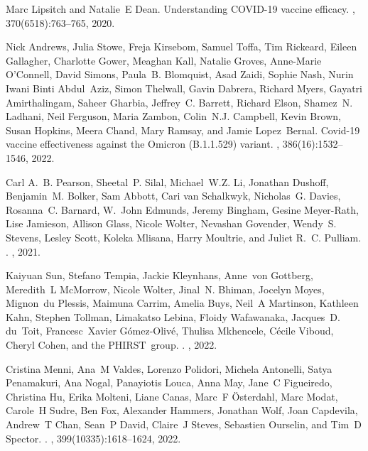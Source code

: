 \documentclass[12pt]{article}
\begin{document}
\begin{thebibliography}{10}
Marc Lipsitch and Natalie~E Dean.
\newblock Understanding {COVID-19} vaccine efficacy.
, 370(6518):763--765, 2020.

Nick Andrews, Julia Stowe, Freja Kirsebom, Samuel Toffa, Tim Rickeard, Eileen
  Gallagher, Charlotte Gower, Meaghan Kall, Natalie Groves, Anne-Marie
  O’Connell, David Simons, Paula~B. Blomquist, Asad Zaidi, Sophie Nash, Nurin
  Iwani Binti Abdul~Aziz, Simon Thelwall, Gavin Dabrera, Richard Myers, Gayatri
  Amirthalingam, Saheer Gharbia, Jeffrey~C. Barrett, Richard Elson, Shamez~N.
  Ladhani, Neil Ferguson, Maria Zambon, Colin~N.J. Campbell, Kevin Brown, Susan
  Hopkins, Meera Chand, Mary Ramsay, and Jamie Lopez~Bernal.
\newblock Covid-19 vaccine effectiveness against the {Omicron (B.1.1.529)}
  variant.
, 386(16):1532--1546, 2022.

Carl A.~B. Pearson, Sheetal~P. Silal, Michael~W.Z. Li, Jonathan Dushoff,
  Benjamin~M. Bolker, Sam Abbott, Cari van Schalkwyk, Nicholas~G. Davies,
  Rosanna~C. Barnard, W.~John Edmunds, Jeremy Bingham, Gesine Meyer-Rath, Lise
  Jamieson, Allison Glass, Nicole Wolter, Nevashan Govender, Wendy~S. Stevens,
  Lesley Scott, Koleka Mlisana, Harry Moultrie, and Juliet R.~C. Pulliam.
.
, 2021.

Kaiyuan Sun, Stefano Tempia, Jackie Kleynhans, Anne~von Gottberg, Meredith~L
  McMorrow, Nicole Wolter, Jinal~N. Bhiman, Jocelyn Moyes, Mignon~du Plessis,
  Maimuna Carrim, Amelia Buys, Neil~A Martinson, Kathleen Kahn, Stephen
  Tollman, Limakatso Lebina, Floidy Wafawanaka, Jacques~D. du~Toit,
  Francesc~Xavier G{\'o}mez-Oliv{\'e}, Thulisa Mkhencele, C{\'e}cile Viboud,
  Cheryl Cohen, and the PHIRST~group.
.
, 2022.

Cristina Menni, Ana~M Valdes, Lorenzo Polidori, Michela Antonelli, Satya
  Penamakuri, Ana Nogal, Panayiotis Louca, Anna May, Jane~C Figueiredo,
  Christina Hu, Erika Molteni, Liane Canas, Marc~F Österdahl, Marc Modat,
  Carole~H Sudre, Ben Fox, Alexander Hammers, Jonathan Wolf, Joan Capdevila,
  Andrew~T Chan, Sean~P David, Claire~J Steves, Sebastien Ourselin, and Tim~D
  Spector.
.
, 399(10335):1618--1624, 2022.


\end{thebibliography}
\end{document}
